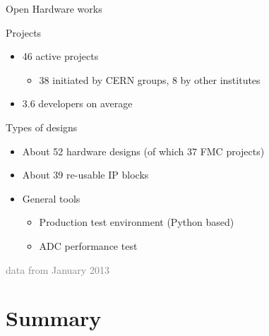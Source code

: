 \documentclass[compress,red]{beamer}
\begin{document}
\begin{frame}{Open Hardware works}
	\begin{block}{Projects}
   \begin{itemize}
	\item 46 active projects
	\begin{itemize}
		\item 38 initiated by CERN groups, 8 by other institutes
	   \end{itemize}
	\item 3.6 developers on average 
   \end{itemize}
	\end{block}

\begin{block}{Types of designs}
\begin{itemize}
	\item About 52 hardware designs (of which 37 FMC projects)
	\item About 39 re-usable IP blocks
	\item General tools
	\begin{itemize}
		\item Production test environment (Python based)
		\item ADC performance test
	\end{itemize}
   \end{itemize}
	\end{block}
\textcolor{gray}{data from January 2013}
\end{frame}
\section{Summary}
\end{document}
